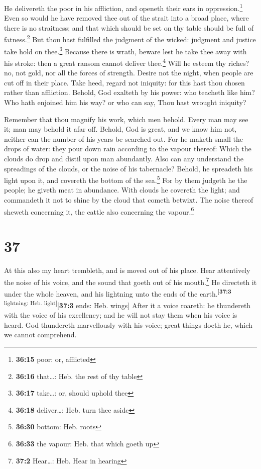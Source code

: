  He delivereth the poor in his affliction, and openeth
their ears in oppression.\footnote{\textbf{36:15} poor: or, afflicted}
 Even so would he have removed thee out of the strait
into a broad place, where there is no straitness; and that which should
be set on thy table should be full of fatness.\footnote{\textbf{36:16}
  that\ldots: Heb. the rest of thy table}  But thou hast
fulfilled the judgment of the wicked: judgment and justice take hold on
thee.\footnote{\textbf{36:17} take\ldots: or, should uphold thee}
 Because there is wrath, beware lest he take thee away
with his stroke: then a great ransom cannot deliver thee.\footnote{\textbf{36:18}
  deliver\ldots: Heb. turn thee aside}  Will he esteem
thy riches? no, not gold, nor all the forces of strength.
 Desire not the night, when people are cut off in their
place.  Take heed, regard not iniquity: for this hast
thou chosen rather than affliction.  Behold, God exalteth
by his power: who teacheth like him?  Who hath enjoined
him his way? or who can say, Thou hast wrought iniquity?

 Remember that thou magnify his work, which men behold.
 Every man may see it; man may behold it afar off.
 Behold, God is great, and we know him not, neither can
the number of his years be searched out.  For he maketh
small the drops of water: they pour down rain according to the vapour
thereof:  Which the clouds do drop and distil upon man
abundantly.  Also can any understand the spreadings of
the clouds, or the noise of his tabernacle?  Behold, he
spreadeth his light upon it, and covereth the bottom of the
sea.\footnote{\textbf{36:30} bottom: Heb. roots}  For by
them judgeth he the people; he giveth meat in abundance. 
With clouds he covereth the light; and commandeth it not to shine by the
cloud that cometh betwixt.  The noise thereof sheweth
concerning it, the cattle also concerning the vapour.\footnote{\textbf{36:33}
  the vapour: Heb. that which goeth up}

\hypertarget{section-36}{%
\section{37}\label{section-36}}

 At this also my heart trembleth, and is moved out of his
place.  Hear attentively the noise of his voice, and the
sound that goeth out of his mouth.\footnote{\textbf{37:2} Hear\ldots:
  Heb. Hear in hearing}  He directeth it under the whole
heaven, and his lightning unto the ends of the
earth.\textsuperscript{{[}\textbf{37:3} lightning: Heb.
light{]}}{[}\textbf{37:3} ends: Heb. wings{]}  After it a
voice roareth: he thundereth with the voice of his excellency; and he
will not stay them when his voice is heard.  God
thundereth marvellously with his voice; great things doeth he, which we
cannot comprehend.

